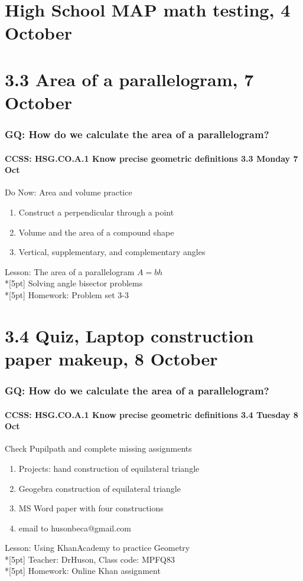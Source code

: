 \documentclass{beamer}
\begin{document}
  \section{High School MAP math testing, 4 October}

  \section{3.3 Area of a parallelogram, 7 October}
    \frame
    {
      \frametitle{GQ: How do we calculate the area of a parallelogram?}
      \framesubtitle{CCSS: HSG.CO.A.1 Know precise geometric definitions \hfill \alert{3.3 Monday 7 Oct}}

      \begin{block}{Do Now: Area and volume practice}
      \begin{enumerate}
        \item Construct a perpendicular through a point
        \item Volume and the area of a compound shape
        \item Vertical, supplementary, and complementary angles
      \end{enumerate}
      \end{block}
      Lesson: The area of a parallelogram $A=bh$\\*[5pt]
      Solving angle bisector problems\\*[5pt]
      Homework: Problem set 3-3
    }

  \section{3.4 Quiz, Laptop construction paper makeup, 8 October}
    \frame
    {
      \frametitle{GQ: How do we calculate the area of a parallelogram?}
      \framesubtitle{CCSS: HSG.CO.A.1 Know precise geometric definitions \hfill \alert{3.4 Tuesday 8 Oct}}

      \begin{block}{Check Pupilpath and complete missing assignments}
      \begin{enumerate}
        \item Projects: hand construction of equilateral triangle
        \item Geogebra construction of equilateral triangle
        \item MS Word paper with four constructions
        \item email to husonbeca@gmail.com
      \end{enumerate}
      \end{block}
      Lesson: Using KhanAcademy to practice Geometry \\*[5pt]
      Teacher: DrHuson, Class code: MPFQ83\\*[5pt]
      Homework: Online Khan assignment
    }
\end{document}
